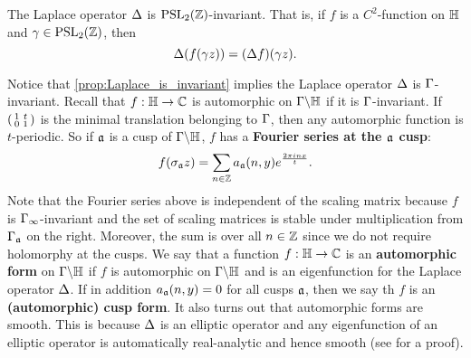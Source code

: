       \begin{proposition}\label{prop:Laplace_is_invariant}
        The Laplace operator $\Delta$ is $\mathrm{PSL}_{2}(\mathbb{Z})$-invariant. That is, if $f$ is a $C^{2}$-function on $\mathbb{H}$ and $\gamma \in \mathrm{PSL}_{2}(\mathbb{Z})$, then
        \[
          \Delta(f(\gamma z)) = (\Delta f)(\gamma z).
        \]
      \end{proposition}

      Notice that \cref{prop:Laplace_is_invariant} implies the Laplace operator $\Delta$ is $\Gamma$-invariant. Recall that $f:\mathbb{H} \to \mathbb{C}$ is automorphic on $\Gamma\backslash\mathbb{H}$ if it is $\Gamma$-invariant. If $\begin{psmallmatrix} 1 & t \\ 0 & 1 \end{psmallmatrix}$ is the minimal translation belonging to $\Gamma$, then any automorphic function is $t$-periodic. So if $\mathfrak{a}$ is a cusp of $\Gamma\backslash\mathbb{H}$, $f$ has a \textbf{Fourier series at the $\mathfrak{a}$ cusp}:
      \[
        f(\sigma_{\mathfrak{a}}z) = \sum_{n \in \mathbb{Z}}a_{\mathfrak{a}}(n,y)e^{\frac{2\pi inx}{t}}.
      \]
      Note that the Fourier series above is independent of the scaling matrix because $f$ is $\Gamma_{\infty}$-invariant and the set of scaling matrices is stable under multiplication from $\Gamma_{\mathfrak{a}}$ on the right. Moreover, the sum is over all $n \in \mathbb{Z}$ since we do not require holomorphy at the cusps. We say that a function $f:\mathbb{H} \to \mathbb{C}$ is an \textbf{automorphic form} on $\Gamma\backslash\mathbb{H}$ if $f$ is automorphic on $\Gamma\backslash\mathbb{H}$ and is an eigenfunction for the Laplace operator $\Delta$. If in addition $a_{\mathfrak{a}}(n,y) = 0$ for all cusps $\mathfrak{a}$, then we say th $f$ is an \textbf{(automorphic) cusp form}. It also turns out that automorphic forms are smooth. This is because $\Delta$ is an elliptic operator and any eigenfunction of an elliptic operator is automatically real-analytic and hence smooth (see \cite{evans2022partial} for a proof).

